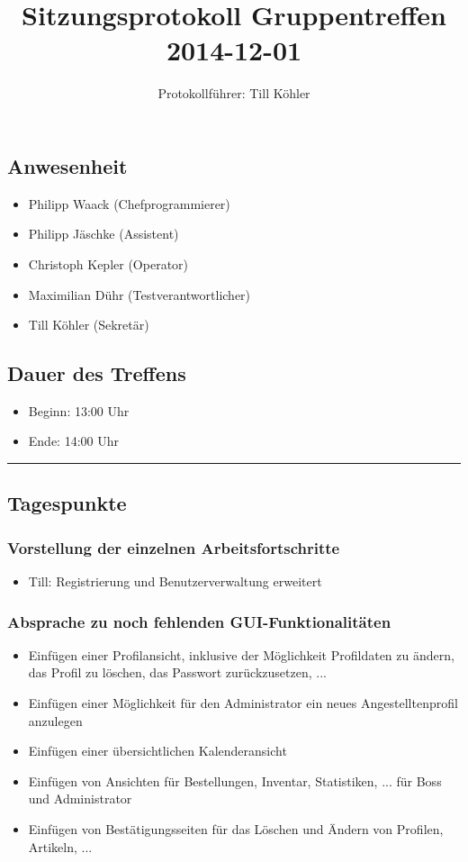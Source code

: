 \documentclass[12pt,a4paper]{article}
\author{Protokollführer: Till Köhler}
\title{Sitzungsprotokoll Gruppentreffen 2014-12-01}
\date{}
\begin{document}
\maketitle

\subsection*{Anwesenheit}
\medskip
\begin{itemize}
\item Philipp Waack (Chefprogrammierer)
\item Philipp Jäschke (Assistent)
\item Christoph Kepler (Operator)
\item Maximilian Dühr (Testverantwortlicher)
\item Till Köhler (Sekretär)
\end{itemize}

\subsection*{Dauer des Treffens}
\medskip
\begin{itemize}
\item Beginn: 13:00 Uhr
\item Ende: 14:00 Uhr
\end{itemize}

\noindent\rule{\textwidth}{1pt}

\subsection*{Tagespunkte}
\medskip

\subsubsection*{Vorstellung der einzelnen Arbeitsfortschritte}
\begin{itemize}
\item Till: Registrierung und Benutzerverwaltung erweitert
\end{itemize}

\subsubsection*{Absprache zu noch fehlenden GUI-Funktionalitäten}
\begin{itemize}
\item Einfügen einer Profilansicht, inklusive der Möglichkeit Profildaten zu ändern, das Profil zu löschen, das Passwort zurückzusetzen, ...
\item Einfügen einer Möglichkeit für den Administrator ein neues Angestelltenprofil anzulegen
\item Einfügen einer übersichtlichen Kalenderansicht
\item Einfügen von Ansichten für Bestellungen, Inventar, Statistiken, ... für Boss und Administrator
\item Einfügen von Bestätigungsseiten für das Löschen und Ändern von Profilen, Artikeln, ... 
\end{itemize}
\end{document}
